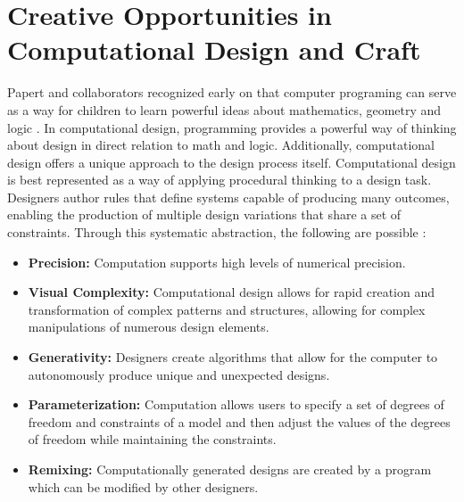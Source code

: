 \documentclass{sigchi}
\begin{document}
\section{Creative Opportunities in Computational Design and Craft}
Papert and collaborators recognized early on that computer programing can serve as a way for children to learn powerful ideas about mathematics, geometry and logic \cite{mindstorms}. In computational design, programming provides a powerful way of thinking about design in direct relation to math and logic. Additionally, computational design offers a unique approach to the design process itself. Computational design is best represented as a way of applying procedural thinking to a design task. Designers author rules that define systems capable of producing many outcomes, enabling the production of  multiple design variations that share a set of constraints. Through this systematic abstraction, the following are possible \cite{reas}:
\begin{itemize}
\item \textbf{Precision:} Computation supports high levels of numerical precision.
\vspace{-8pt}
\item \textbf{Visual Complexity:} Computational design allows for rapid creation and transformation of complex patterns and structures, allowing for complex manipulations of numerous design elements.
\vspace{-6pt}
\item \textbf{Generativity:} Designers create algorithms that allow for the computer to autonomously produce unique and unexpected designs.
\vspace{-6pt}
\item \textbf{Parameterization:} Computation allows users to specify a set of degrees of freedom and constraints of a model and then adjust the values of the degrees of freedom while maintaining the constraints.
\vspace{-6pt}
\item \textbf{Remixing:} Computationally generated designs are created by a program which can be modified by other designers. 
\end{itemize}	
\end{document}
